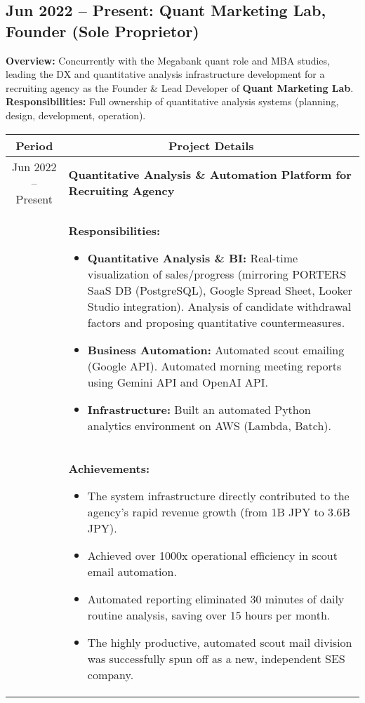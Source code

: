\documentclass[uplatex,a4j,10.5pt,dvipdfmx]{jsarticle}
\newcommand{\textbfsubsection}[1]{\subsection*{\textbf{#1}}}
\begin{document}
\textbfsubsection{Jun 2022 -- Present: Quant Marketing Lab, Founder (Sole Proprietor)}
\noindent\textbf{Overview:} Concurrently with the Megabank quant role and MBA studies, leading the DX and quantitative analysis infrastructure development for a recruiting agency as the Founder \& Lead Developer of \textbf{Quant Marketing Lab}.
\noindent\textbf{Responsibilities:} Full ownership of quantitative analysis systems (planning, design, development, operation).
\begin{longtable}{|c|p{14cm}|}
	\hline
	\multicolumn{1}{|c|}{\textbf{Period}} & \multicolumn{1}{c|}{\textbf{Project Details}}                                             \\
	\hline
	\endhead
	\hline
	Jun 2022 -- Present                   & \textbf{\textbullet{} Quantitative Analysis \& Automation Platform for Recruiting Agency} \\
	                                      & {\small \textbf{Responsibilities:}}
	\begin{itemize}[leftmargin=*,noitemsep]
		\item \textbf{Quantitative Analysis \& BI:} Real-time visualization of sales/progress (mirroring PORTERS SaaS DB (PostgreSQL), Google Spread Sheet, Looker Studio integration). Analysis of candidate withdrawal factors and proposing quantitative countermeasures.
		\item \textbf{Business Automation:} Automated scout emailing (Google API). Automated morning meeting reports using Gemini API and OpenAI API.
		\item \textbf{Infrastructure:} Built an automated Python analytics environment on AWS (Lambda, Batch).
	\end{itemize}
	\\
	                                      & {\small \textbf{Achievements:}}
	\begin{itemize}[leftmargin=*,noitemsep]
		\item The system infrastructure directly contributed to the agency's rapid revenue growth (from 1B JPY to 3.6B JPY).
		\item Achieved over 1000x operational efficiency in scout email automation.
		\item Automated reporting eliminated 30 minutes of daily routine analysis, saving over 15 hours per month.
		\item The highly productive, automated scout mail division was successfully spun off as a new, independent SES company.
	\end{itemize}
	\\
	\hline
\end{longtable}
\end{document}
